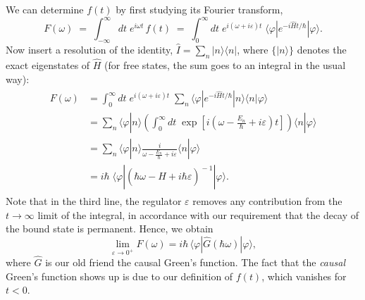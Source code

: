 \documentclass[pra,12pt]{revtex4}
\begin{document}
We can determine $f(t)$ by first studying its Fourier transform,
\begin{equation}
  F(\omega) \;=\; \int_{-\infty}^\infty dt \; e^{i\omega t}\, f(t) \;=\; \int_0^\infty dt \; e^{i(\omega + i\varepsilon) t} \; \langle\varphi|e^{-i\hat{H}t/\hbar}|\varphi\rangle.
\end{equation}
Now insert a resolution of the identity, $\hat{I} = \sum_n
|n\rangle\langle n|$, where $\{|n\rangle\}$ denotes the exact
eigenstates of $\hat{H}$ (for free states, the sum goes to an integral
in the usual way):
\begin{align}
  \begin{aligned}F(\omega) &= \int_0^\infty dt \; e^{i(\omega + i\varepsilon) t} \; \sum_n \langle\varphi|e^{-i\hat{H}t/\hbar}|n\rangle\langle n|\varphi\rangle \\ &= \sum_n \langle\varphi|n\rangle \left( \int_0^\infty dt \; \exp\left[i\left(\omega - \frac{E_n}{\hbar} + i\varepsilon\right) t\right] \right) \langle n|\varphi\rangle \\ &= \sum_n \langle\varphi|n\rangle \frac{i}{\omega - \frac{E_n}{\hbar} + i \varepsilon} \langle n|\varphi\rangle \\ &= i \hbar\; \langle \varphi | \left(\hbar\omega - \hat{H} + i\hbar\varepsilon \right)^{\!-1} | \varphi\rangle. \end{aligned}
\end{align}
Note that in the third line, the regulator $\varepsilon$ removes any
contribution from the $t \rightarrow\infty$ limit of the integral, in
accordance with our requirement that the decay of the bound state is
permanent.  Hence, we obtain
\begin{equation}
  \lim_{\varepsilon \rightarrow 0^+} F(\omega) = i \hbar \, \langle \varphi | \hat{G}(\hbar\omega) | \varphi\rangle,
\end{equation}
where $\hat{G}$ is our old friend the causal Green's function.  The
fact that the \textit{causal} Green's function shows up is due to our
definition of $f(t)$, which vanishes for $t < 0$.
\end{document}
